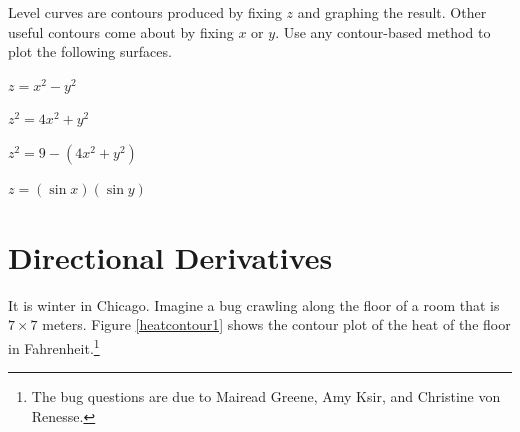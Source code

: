 \documentclass{problemset}
\begin{document}
	\question
	Level curves are contours produced by fixing $z$ and graphing the result.  Other useful contours
	come about by fixing $x$ or $y$.  Use any contour-based method to plot the following surfaces.
	\begin{parts}
		\item $z=x^2-y^2$
		\item $z^2=4x^2+y^2$
		\item $z^2=9-(4x^2+y^2)$
		\item $z=(\sin x)(\sin y)$
	\end{parts}

\newpage
\section*{Directional Derivatives}


	\question
	It is winter in Chicago.  Imagine a bug crawling along the floor of
	a room that is $7\times 7$ meters.  Figure \ref{heatcontour1} shows the contour plot of the heat
	of the floor in Fahrenheit.\footnote{The bug questions are due to Mairead Greene, Amy Ksir, and Christine von Renesse.}
\end{document}
